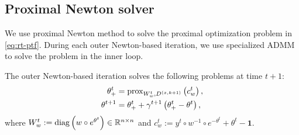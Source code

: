 \subsection{Proximal Newton solver} %

We use proximal Newton method to solve the proximal optimization problem in \eqref{eq:rt-ptf}. During each outer Newton-based iteration, we use specialized ADMM \cite{ramdas2016fast} to solve the problem in the inner loop. %


The outer Newton-based iteration solves the following problems at time $t+1$:
\begin{align} \label{spec-prox}
  \theta_+^t &= \mathrm{prox}_{W_w^t,D^{(x,k+1)}} \left(c_w^{t}\right), \\
  \theta^{t+1} &= \theta_+^t + \gamma^{t+1} \left(\theta_+^t - \theta^t\right),
\end{align}
where $W_w^t := \operatorname*{diag} \left(w\circ e^{\theta^t}\right)\in \mathbb{R}^{n\times n}$ and $c_w^t := y^t\circ w^{-1}\circ e^{-\theta^t} + \theta^t - \boldsymbol{1}$.%



